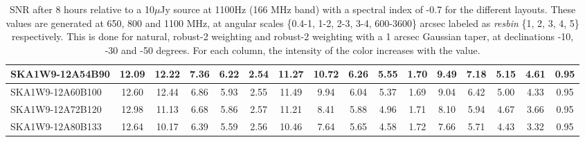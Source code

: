 \begin{table}[H]
{{\begin{tabular}{|lccccc||ccccc||ccccc|}
SKA1W9-12A54B90 & 12.09 \cellcolor{blue!49.65} & 12.22 \cellcolor{red!58.04} & 7.36 \cellcolor{green!60.00} & 6.22 \cellcolor{orange!60.00} & 2.54 \cellcolor{purple!18.00} & 11.27 \cellcolor{blue!57.23} & 10.72 \cellcolor{red!60.00} & 6.26 \cellcolor{green!60.00} & 5.55 \cellcolor{orange!60.00} & 1.70 \cellcolor{purple!22.20} & 9.49 \cellcolor{blue!60.00} & 7.18 \cellcolor{red!60.00} & 5.15 \cellcolor{green!60.00} & 4.61 \cellcolor{orange!60.00} & 0.95 \cellcolor{purple!18.00}\\ \hline 
SKA1W9-12A60B100 & 12.60 \cellcolor{blue!55.58} & 12.44 \cellcolor{red!60.00} & 6.86 \cellcolor{green!45.62} & 5.93 \cellcolor{orange!41.82} & 2.55 \cellcolor{purple!21.82} & 11.49 \cellcolor{blue!60.00} & 9.94 \cellcolor{red!52.05} & 6.04 \cellcolor{green!50.17} & 5.37 \cellcolor{orange!52.21} & 1.69 \cellcolor{purple!18.00} & 9.04 \cellcolor{blue!53.72} & 6.42 \cellcolor{red!42.93} & 5.00 \cellcolor{green!51.25} & 4.33 \cellcolor{orange!50.88} & 0.95 \cellcolor{purple!18.00}\\ \hline 
SKA1W9-12A72B120 & 12.98 \cellcolor{blue!60.00} & 11.13 \cellcolor{red!48.34} & 6.68 \cellcolor{green!40.44} & 5.86 \cellcolor{orange!37.43} & 2.57 \cellcolor{purple!29.45} & 11.21 \cellcolor{blue!56.48} & 8.41 \cellcolor{red!36.45} & 5.88 \cellcolor{green!43.02} & 4.96 \cellcolor{orange!34.45} & 1.71 \cellcolor{purple!26.40} & 8.10 \cellcolor{blue!40.60} & 5.94 \cellcolor{red!32.15} & 4.67 \cellcolor{green!32.00} & 3.66 \cellcolor{orange!29.07} & 0.95 \cellcolor{purple!18.00}\\ \hline 
SKA1W9-12A80B133 & 12.64 \cellcolor{blue!56.04} & 10.17 \cellcolor{red!39.80} & 6.39 \cellcolor{green!32.10} & 5.59 \cellcolor{orange!20.51} & 2.56 \cellcolor{purple!25.64} & 10.46 \cellcolor{blue!47.05} & 7.64 \cellcolor{red!28.60} & 5.65 \cellcolor{green!32.74} & 4.58 \cellcolor{orange!18.00} & 1.72 \cellcolor{purple!30.60} & 7.66 \cellcolor{blue!34.47} & 5.71 \cellcolor{red!26.98} & 4.43 \cellcolor{green!18.00} & 3.32 \cellcolor{orange!18.00} & 0.95 \cellcolor{purple!18.00}\\ \hline 
\end{tabular}}
\vspace{-0.300000cm}
\hspace{1cm} 

\vspace{.25cm}
\caption{SNR after 8 hours relative to a 10$\mu$Jy source at 1100Hz (166 MHz band) with a spectral index of -0.7 for the different layouts. These values are generated at 650, 800 and 1100 MHz, at angular scales \{0.4-1, 1-2, 2-3, 3-4, 600-3600\} arcsec labeled as {\it resbin} \{1, 2, 3, 4, 5\} respectively. This is done for natural, robust-2 weighting and robust-2 weighting with a 1 arcsec Gaussian taper, at declinations -10, -30 and -50 degrees. For each column, the intensity of the color increases with the value.}\label{tab:snr10}}
 \end{table}
